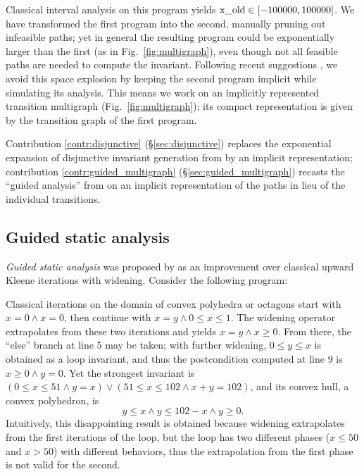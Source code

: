 \documentclass[preprint]{sigplanconf}
\begin{document}
Classical interval analysis on this program yields $\lstinline|x_old| \in [-100000,100000]$.
We have transformed the first program into the second, manually pruning out infeasible paths; yet in general the resulting program could be exponentially larger than the first (as in Fig.~\ref{fig:multigraph}), even though not all feasible paths are needed to compute the invariant.
Following recent suggestions \cite{Gawlitza_Monniaux_ESOP11,Monniaux_Gonnord_SAS11}, we avoid this space explosion by keeping the second program implicit while simulating its analysis. This means we work on an implicitly represented transition multigraph (Fig.~\ref{fig:multigraph}); its compact representation is given by the transition graph of the first program.

Contribution \ref{contr:disjunctive} (\S\ref{sec:disjunctive}) replaces the exponential expansion of disjunctive invariant generation from \citet{DBLP:conf/pldi/GulwaniZ10} by an implicit representation;
contribution \ref{contr:guided_multigraph} (\S\ref{sec:guided_multigraph}) recasts the ``guided analysis'' from \citet{DBLP:conf/sas/GopanR07} on an implicit representation of the paths in lieu of the individual transitions.

\subsection{Guided static analysis}
\label{sec:guided}
\emph{Guided static analysis} was proposed by \citet{DBLP:conf/sas/GopanR07} as an improvement over classical upward Kleene iterations with widening.
Consider the following program:


Classical iterations on the domain of convex polyhedra \cite{Halbwachs_PhD,CousotHalbwachs78} or octagons \cite{Mine_PhD,DBLP:journals/lisp/Mine06} start with $x = 0 \land x = 0$, then continue with $x = y \land 0 \leq x \leq 1$.
The widening operator extrapolates from these two iterations and yields $x = y \land x \geq 0$.
From there, the ``else'' branch at line 5 may be taken; with further widening, $0 \leq y \leq x$ is obtained as a loop invariant, and thus the postcondition computed at line 9 is $x \geq 0 \land y = 0$.
Yet the strongest invariant is $(0 \leq x \leq 51 \land y = x) \lor (51 \leq x \leq 102 \land x+y=102)$, and its convex hull, a convex polyhedron, is
\begin{equation}
y \leq x \land y \leq 102-x \land y \geq 0.\label{eqn:triangle}
\end{equation} %
Intuitively, this disappointing result is obtained because widening extrapolates from the first iterations of the loop, but the loop has two different phases ($x \leq 50$ and $x > 50$) with different behaviors, thus the extrapolation from the first phase is not valid for the second.
\end{document}
